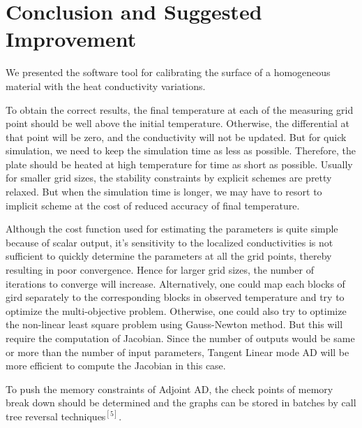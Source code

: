 \documentclass[10pt,a4paper]{report}
\begin{document}
\chapter{Conclusion and Suggested Improvement}

We presented the software tool for calibrating the surface of a homogeneous material with the heat conductivity variations.

To obtain the correct results, the final temperature at each of the measuring grid point should be well above the initial temperature. Otherwise, the differential at that point will be zero, and the conductivity will not be updated. But for quick simulation, we need to keep the simulation time as less as possible. Therefore, the plate should be heated at high temperature for time as short as possible. Usually for smaller grid sizes, the stability constraints by explicit schemes are pretty relaxed. But when the simulation time is longer, we may have to resort to implicit scheme at the cost of reduced accuracy of final temperature.  

Although the cost function used for estimating the parameters is quite simple because of scalar output, it's sensitivity to the localized conductivities is not sufficient to quickly determine the parameters at all the grid points, thereby resulting in poor convergence. Hence for larger grid sizes, the number of iterations to converge will increase. Alternatively, one could map each blocks of gird separately to the corresponding blocks in observed temperature and try to optimize the multi-objective problem. Otherwise, one could also try to optimize the non-linear least square problem using Gauss-Newton method. But this will require the computation of Jacobian. Since the number of outputs would be same or more than the number of input parameters, Tangent Linear mode AD will be more efficient to compute the Jacobian in this case.

To push the memory constraints of Adjoint AD, the check points of memory break down should be determined and the graphs can be stored in batches  by call tree reversal techniques$^{[5]}$.
\end{document}

